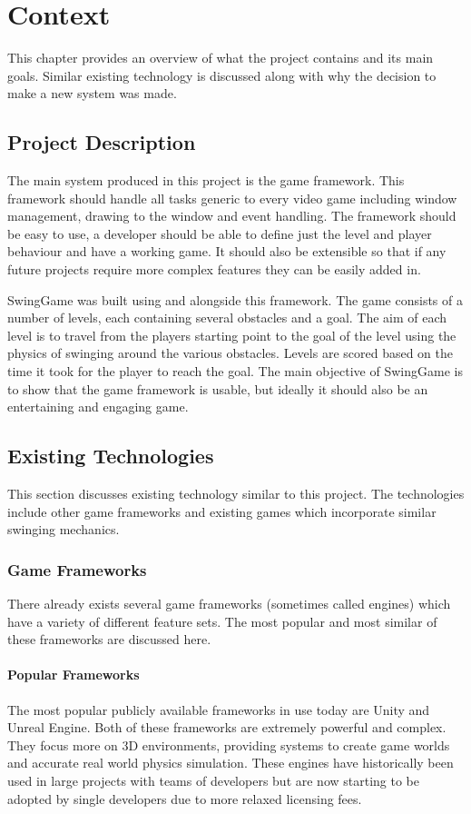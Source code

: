 \documentclass[]{report}
\begin{document}
\chapter{Context}
This chapter provides an overview of what the project contains and its main goals. Similar existing technology is discussed along with why the decision to make a new system was made.
	\section{Project Description}
	The main system produced in this project is the game framework. This framework should handle all tasks generic to every video game including window management, drawing to the window and event handling. The framework should be easy to use, a developer should be able to define just the level and player behaviour and have a working game. It should also be extensible so that if any future projects require more complex features they can be easily added in.
	
	SwingGame was built using and alongside this framework. The game consists of a number of levels, each containing several obstacles and a goal. The aim of each level is to travel from the players starting point to the goal of the level using the physics of swinging around the various obstacles. Levels are scored based on the time it took for the player to reach the goal. The main objective of SwingGame is to show that the game framework is usable, but ideally it should also be an entertaining and engaging game.
	\section{Existing Technologies}
	This section discusses existing technology similar to this project. The technologies include other game frameworks and existing games which incorporate similar swinging mechanics.
		\subsection{Game Frameworks}
		There already exists several game frameworks (sometimes called engines) which have a variety of different feature sets. The most popular and most similar of these frameworks are discussed here.
			\subsubsection{Popular Frameworks}
			The most popular publicly available frameworks in use today are Unity\cite{unity} and Unreal Engine\cite{unreal}. Both of these frameworks are extremely powerful and complex. They focus more on 3D environments, providing systems to create game worlds and accurate real world physics simulation. These engines have historically been used in large projects with teams of developers but are now starting to be adopted by single developers due to more relaxed licensing fees.
\end{document}
